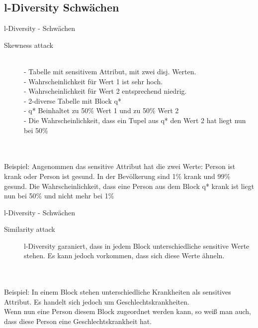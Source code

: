 \subsection{l-Diversity Schwächen}

\begin{frame}{l-Diversity - Schwächen}

\begin{description}
	\item[Skewness attack] \ \\- Tabelle mit sensitivem Attribut, mit zwei disj. Werten.\\
    - Wahrscheinlichkeit für Wert 1 ist sehr hoch.\\
    - Wahrscheinlichkeit für Wert 2 entsprechend niedrig.\\
    - 2-diverse Tabelle mit Block q*\\
    - q* Beinhaltet zu 50\% Wert 1 und zu 50\%  Wert 2\\
    - Die Wahrscheinlichkeit, dass ein Tupel aus q* den Wert 2 hat liegt nun bei 50\%  \cite{Li2007t-closseness} 
\end{description} \ \\
\ \\
Beispiel: Angenommen das sensitive Attribut hat die zwei Werte: Person ist krank oder Person ist gesund. In der Bevölkerung sind 1\% krank und 99\% gesund. Die Wahrscheinlichkeit, dass eine Person aus dem Block q* krank ist liegt nun bei 50\% und nicht mehr bei 1\%
\end{frame}

\begin{frame}{l-Diversity - Schwächen}
\begin{description}	
	\item[Similarity attack] l-Diversity garaniert, dass in jedem Block unterschiedliche sensitive Werte stehen. Es kann jedoch vorkommen, dass sich diese Werte ähneln. \cite{Li2007t-closseness} 
\end{description} \ \\
\ \\
Beispiel: In einem Block stehen unterschiedliche Krankheiten als sensitives Attribut. Es handelt sich jedoch um Geschlechtskrankheiten. \ \\
Wenn nun eine Person diesem Block zugeordnet werden kann, so weiß man auch, dass diese Person eine Geschlechtskrankheit hat.

\end{frame}
